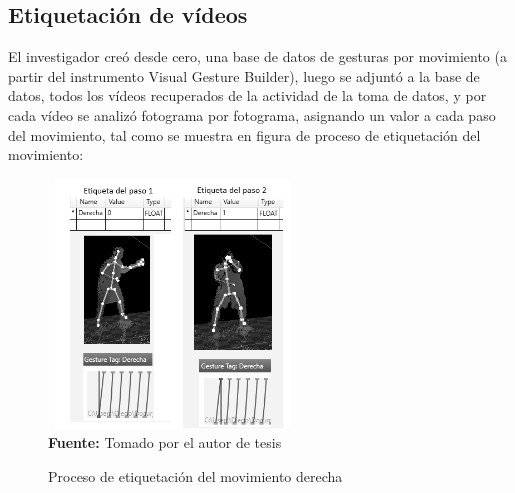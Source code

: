 \subsection{Etiquetaci\'on de v\'ideos}
El investigador cre\'o desde cero, una base de datos de gesturas por movimiento (a partir del instrumento Visual Gesture Builder), luego se adjunt\'o a la base de datos, todos los v\'ideos recuperados de la actividad de la toma de datos, y por cada v\'ideo se analiz\'o fotograma por fotograma, asignando un valor a cada paso del movimiento, tal como se muestra en figura de proceso de etiquetaci\'on del movimiento:
 \begin{figure}[H]
	\caption{Proceso de etiquetaci\'on del movimiento derecha}
	\label{fig:getTag}
	\centering
	\includegraphics[width=250px,height=250px]{graphics/etiquetas.png} \\
	\textbf{Fuente:} Tomado por el autor de tesis
\end{figure} 
